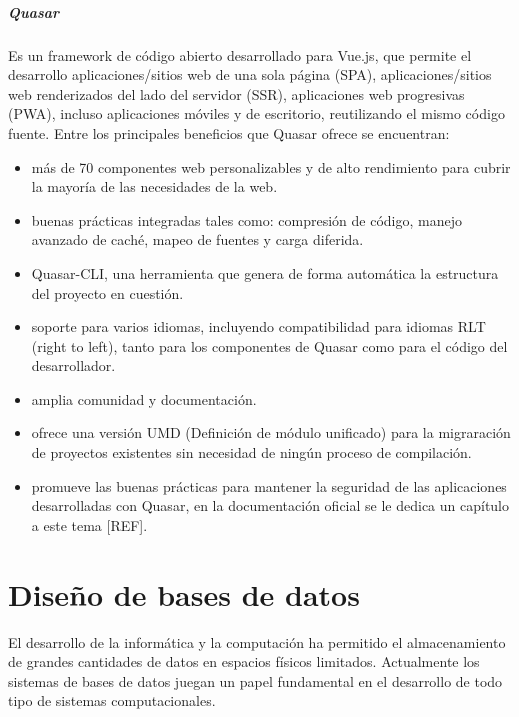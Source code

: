 \subparagraph{Quasar}
Es un framework de código abierto desarrollado para Vue.js,
que permite el desarrollo aplicaciones/sitios web de una sola página (SPA),
aplicaciones/sitios web renderizados del lado del servidor (SSR),
aplicaciones web progresivas (PWA), incluso aplicaciones móviles y de 
escritorio, reutilizando el mismo código fuente. 
Entre los principales beneficios que Quasar ofrece 
se encuentran:

\begin{itemize}
    \item más de 70 componentes web personalizables y de alto rendimiento para cubrir la 
    mayoría de las necesidades de la web.
    \item buenas prácticas integradas tales como: compresión de código, 
    manejo avanzado de caché, mapeo de fuentes y carga diferida. 
    \item Quasar-CLI, una herramienta que genera de forma automática la estructura del 
    proyecto en cuestión.
    \item soporte para varios idiomas, incluyendo 
    compatibilidad para idiomas RLT (right to left), tanto para los componentes de Quasar
    como para el código del desarrollador.  
    \item amplia comunidad y documentación.
    \item ofrece una versión UMD (Definición de módulo unificado) para la migraración
    de proyectos existentes sin necesidad de ningún proceso de compilación.
    \item promueve las buenas prácticas para mantener la seguridad de las aplicaciones
    desarrolladas con Quasar, en la documentación oficial se le dedica un capítulo
    a este tema [REF].

\end{itemize}







\section{Diseño de bases de datos}
El desarrollo de la informática y la computación ha permitido
el almacenamiento de grandes cantidades de datos en espacios 
físicos limitados. Actualmente los sistemas de bases de datos juegan
un papel fundamental en el desarrollo de todo tipo de sistemas computacionales.

